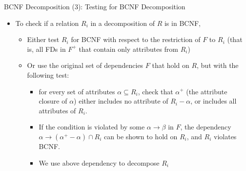 \documentclass[aspectratio=169, xcolor=dvipsnames]{beamer}
\begin{document}
\begin{frame}{BCNF Decomposition (3): Testing for BCNF Decomposition}
    \begin{itemize}[<+->]
        \item To check if a relation $R_i$ in a decomposition of $R$ is in BCNF,
        \begin{itemize}
            \item[$\triangleright$] Either test $R_i$ for BCNF with respect to the restriction of $F$ to $R_i$ (that is, all FDs in $F^+$ that contain only attributes from $R_i$)
            \item[$\triangleright$] Or use the original set of dependencies $F$ that hold on $R$, but with the following test:
            \begin{itemize}
                \item for every set of attributes $\alpha \subseteq R_i$, check that $\alpha^+$ (the attribute closure of $\alpha$) either includes no attribute of $R_i - \alpha$, or includes all attributes of $R_i$.
                \item If the condition is violated by some $\alpha \rightarrow \beta$ in $F$, the dependency $\alpha \rightarrow (\alpha^+ - \alpha) \cap R_i$ can be shown to hold on $R_i$, and $R_i$ violates BCNF.
                \item We use above dependency to decompose $R_i$
            \end{itemize}
        \end{itemize}
    \end{itemize}
\end{frame}
\end{document}
